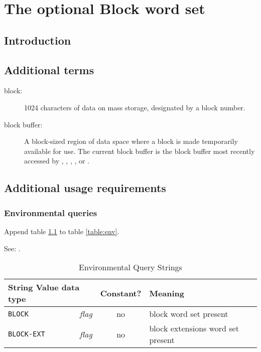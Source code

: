\chapter{The optional Block word set} %

\section{Introduction} %

\section{Additional terms} %

\begin{description}
\item[block:]
	1024 characters of data on mass storage,
	designated by a block number.

\item[block buffer:]
	A block-sized region of data space where a block is made
	temporarily available for use. The current block buffer
	is the block buffer most recently accessed by
	, , , , or
	.
\end{description}

\section{Additional usage requirements} %

\subsection{Environmental queries} %

Append table \ref{block:env} to table \ref{table:env}.

See: .

\begin{table}[h]
  \begin{center}
	\caption{Environmental Query Strings}
	\label{block:env}
	\begin{tabular}{p{9em}rcp{}}
		\hline\hline
		\multicolumn{2}{l}{String \hfill Value data type} & Constant? & Meaning \\
		\hline
		\texttt{BLOCK}		& \emph{flag}	& no	&
			block word set present \\
		\texttt{BLOCK-EXT}	& \emph{flag}	& no	&
			block extensions word set present \\
		\hline\hline
	\end{tabular}
  \end{center}
\end{table}

